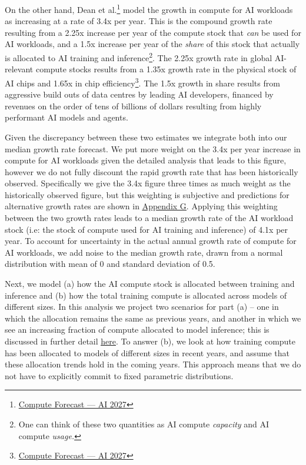 \documentclass[11pt]{article}
\begin{document}
On the other hand, Dean et al.\footnote{\href{https://ai-2027.com/research/compute-forecast}{Compute Forecast --- AI 2027}} model the growth in compute for AI workloads as increasing at a rate of 3.4x per year. This is the compound growth rate resulting from a 2.25x increase per year of the compute stock that \textit{can} be used for AI workloads, and a 1.5x increase per year of the \textit{share} of this stock that actually is allocated to AI training and inference\footnote{One can think of these two quantities as AI compute \textit{capacity} and AI compute \textit{usage.}}. The 2.25x growth rate in global AI-relevant compute stocks results from a 1.35x growth rate in the physical stock of AI chips and 1.65x in chip efficiency\footnote{\href{https://ai-2027.com/research/compute-forecast}{Compute Forecast --- AI 2027}}. The 1.5x growth in share results from aggressive build outs of data centres by leading AI developers, financed by revenues on the order of tens of billions of dollars resulting from highly performant AI models and agents.

Given the discrepancy between these two estimates we integrate both into our median growth rate forecast. We put more weight on the 3.4x per year increase in compute for AI workloads given the detailed analysis that leads to this figure, however we do not fully discount the rapid growth rate that has been historically observed. Specifically we give the 3.4x figure three times as much weight as the historically observed figure, but this weighting is subjective and predictions for alternative growth rates are shown in \underline{\hyperref[appendix-g-results-for-varying-growth-rate-weightings]{Appendix G}}. Applying this weighting between the two growth rates leads to a median growth rate of the AI workload stock (i.e: the stock of compute used for AI training and inference) of 4.1x per year. To account for uncertainty in the actual annual growth rate of compute for AI workloads, we add noise to the median growth rate, drawn from a normal distribution with mean of 0 and standard deviation of 0.5.

Next, we model (a) how the AI compute stock is allocated between training and inference and (b) how the total training compute is allocated across models of different sizes. In this analysis we project two scenarios for part (a) -- one in which the allocation remains the same as previous years, and another in which we see an increasing fraction of compute allocated to model inference; this is discussed in further detail \underline{\hyperref[allocating-compute-between-training-inference-and-other-workloads]{here}}. To answer (b), we look at how training compute has been allocated to models of different sizes in recent years, and assume that these allocation trends hold in the coming years. This approach means that we do not have to explicitly commit to fixed parametric distributions.
\end{document}
